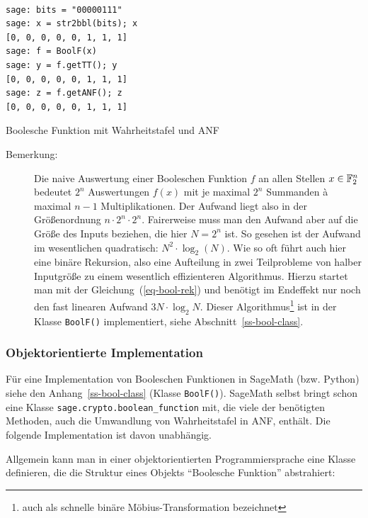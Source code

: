 \begin{refsegment}
\begin{sagecode}
\begin{verbatim}

sage: bits = "00000111"
sage: x = str2bbl(bits); x
[0, 0, 0, 0, 0, 1, 1, 1]
sage: f = BoolF(x)
sage: y = f.getTT(); y
[0, 0, 0, 0, 0, 1, 1, 1]
sage: z = f.getANF(); z
[0, 0, 0, 0, 0, 1, 1, 1]
\end{verbatim}
\caption{Boolesche Funktion mit Wahrheitstafel und ANF}
\label{Sage-code-bool-anf}
\end{sagecode}

\begin{description}
   \item[Bemerkung:] Die naive Auswertung einer Booleschen Funktion $f$
      an allen Stellen $x \in \mathbb{F}_2^n$ bedeutet $2^n$ Auswertungen $f(x)$ mit je maximal
      $2^n$ Summanden à maximal $n-1$ Multiplikationen. Der Aufwand liegt also
      in der Größenordnung $n\cdot 2^n \cdot 2^n$. Fairerweise muss man den Aufwand
      aber auf die Größe des Inputs beziehen, die hier
      $N = 2^n$ ist. So gesehen ist der Aufwand im wesentlichen quadratisch:
      $N^2\cdot \log_2(N)$. Wie so oft führt auch hier eine
      binäre Rekursion,
      also eine Aufteilung in zwei Teilprobleme von halber Inputgröße zu einem
      wesentlich effizienteren Algorithmus. Hierzu startet man mit der
      Gleichung~(\ref{eq-bool-rek}) und benötigt im Endeffekt nur noch den
      fast linearen Aufwand $3N\cdot \log_2 N$. Dieser Algorithmus\footnote{%
      auch als schnelle binäre Möbius-Transformation bezeichnet
      } ist in der Klasse {\tt BoolF()} implementiert, siehe Abschnitt~\ref{ss-bool-class}.
\end{description}

\subsubsection*{Objektorientierte Implementation}

Für eine Implementation von Booleschen Funktionen in SageMath (bzw. Python) siehe
den Anhang~\ref{ss-bool-class} (Klasse {\tt BoolF()}).
SageMath selbst bringt schon eine Klasse
{\tt sage.crypto.boolean\_function} mit, die viele der benötigten Methoden,
auch die Umwandlung von Wahrheitstafel in ANF,
enthält. Die folgende Implementation ist davon unabhängig.

Allgemein kann man in einer objektorientierten Programmiersprache eine Klasse definieren,
die die Struktur eines Objekts "`Boolesche Funktion"'
abstrahiert:


\end{refsegment}
